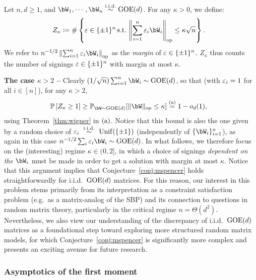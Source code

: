 Let $n, d \geq 1$, and $\bW_1, \cdots, \bW_n \iid \GOE(d)$.
For any $\kappa > 0$, we define: 
\begin{equation}
    \label{eq:def_Zkappa}
    Z_\kappa \coloneqq \# \left\{\eps \in \{\pm 1\}^n \, \textrm{s.t.} \, \left\|\sum_{i=1}^n \eps_i \bW_i\right\|_{\op} \leq \kappa \sqrt{n} \right\}.
\end{equation}
We refer to $n^{-1/2} \left\|\sum_{i=1}^n \eps_i \bW_i\right\|_{\op}$ as the \emph{margin} of $\varepsilon \in \{\pm 1\}^n$. 
$Z_\kappa$ thus counts the number of signings $\varepsilon \in \{\pm 1\}^n$ with margin at most $\kappa$.

\myskip
\textbf{The case $\kappa > 2$ --}
Clearly $(1/\sqrt{n})\sum_{i=1}^n \bW_i \sim \GOE(d)$, so that (with $\varepsilon_i = 1$ for all $i \in [n]$), for any $\kappa > 2$, 
\begin{equation}\label{eq:kappa_gtr_2}
    \bbP\left[Z_\kappa \geq 1\right] \geq \bbP_{\bW \sim \GOE(d)}[\|\bW\|_\op \leq \kappa] \aeq 1 - \smallO_d(1),
\end{equation}
using Theorem~\ref{thm:wigner} in $(\rm a)$.
Notice that this bound is also the one given by a random choice of $\varepsilon_i~\overset{\mathrm{i.i.d.}}{\sim}~\mathrm{Unif}(\{\pm 1\})$ (independently of $\{\bW_i\}_{i=1}^n$), as again in this case 
$n^{-1/2}\sum_{i} \eps_i \bW_i\sim\GOE(d)$.
In what follows, we therefore focus on the (interesting) regime $\kappa \in (0,2]$, in which a choice of signings \emph{dependent on the $\bW_i$} must be made in order to 
get a solution with margin at most $\kappa$.
Notice that this argument implies that Conjecture~\ref{conj:mspencer} holds straightforwardly for i.i.d.\ $\mathrm{GOE}(d)$ matrices.
For this reason, our interest in this problem stems primarily from its interpretation as a constraint satisfaction problem (e.g.\ as a matrix-analog of the SBP) and its connection to questions in random matrix theory, particularly in the critical regime $n = \Theta(d^2)$.
Nevertheless, we also view our understanding of the discrepancy of i.i.d.\ $\mathrm{GOE}(d)$ matrices as a foundational step toward exploring more structured random matrix models, for which Conjecture~\ref{conj:mspencer} is significantly more complex and presents an exciting avenue for future research.

\subsubsection{Asymptotics of the first moment}

